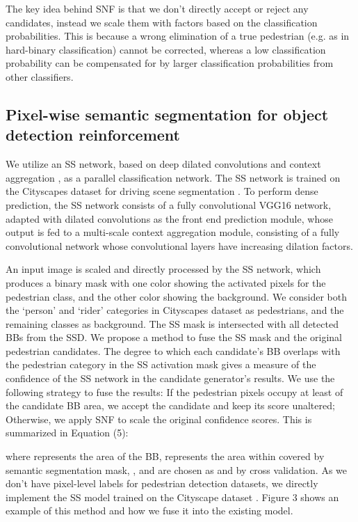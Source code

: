\documentclass[10pt,letterpaper]{article}
\begin{document}
The key idea behind SNF is that we don't directly accept or reject any candidates, instead we scale them with factors based on the classification probabilities. This is because a wrong elimination of a true pedestrian (e.g. as in hard-binary classification) cannot be corrected, whereas a low classification probability can be compensated for by larger classification probabilities from other classifiers.

\subsection{Pixel-wise semantic segmentation for object detection reinforcement} 
We utilize an SS network, based on deep dilated convolutions and context aggregation \cite{sspaper}, as a parallel classification network. The SS network is trained on the Cityscapes dataset for driving scene segmentation \cite{cityscapes}. To perform dense prediction, the SS network consists of a fully convolutional VGG16 network, adapted with dilated convolutions as the front end prediction module, whose output is fed to a multi-scale context aggregation module, consisting of a fully convolutional network whose convolutional layers have increasing dilation factors. 

An input image is scaled and directly processed by the SS network, which produces a binary mask with one color showing the activated pixels for the pedestrian class, and the other color showing the background. We consider both the `person' and `rider' categories in Cityscapes dataset as pedestrians, and the remaining classes as background. The SS mask is intersected with all detected BBs from the SSD. We propose a method to fuse the SS mask and the original pedestrian candidates. The degree to which each candidate's BB overlaps with the pedestrian category in the SS activation mask gives a measure of the confidence of the SS network in the candidate generator's results. We use the following strategy to fuse the results: If the pedestrian pixels occupy at least  of the candidate BB area, we accept the candidate and keep its score unaltered; Otherwise, we apply SNF to scale the original confidence scores. This is summarized in Equation (5):

where  represents the area of the BB,  represents the area within  covered by semantic segmentation mask, , and  are chosen as  and  by cross validation. As we don't have pixel-level labels for pedestrian detection datasets, we directly implement the SS model \cite{sspaper} trained on the Cityscape dataset \cite{cityscapes}. Figure 3 shows an example of this method and how we fuse it into the existing model.
\end{document}
